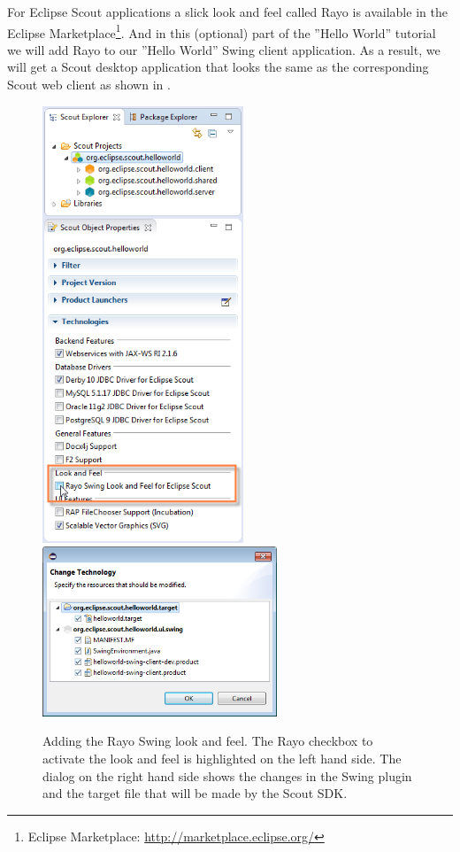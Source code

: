 \documentclass[a4paper,10pt,twoside]{book}
\begin{document}
For Eclipse Scout applications a slick look and feel called Rayo is available in the Eclipse Marketplace\footnote{
Eclipse Marketplace: \url{http://marketplace.eclipse.org/}
}.
And in this (optional) part of the ''Hello World'' tutorial we will add Rayo to our ''Hello World'' Swing client application.
As a result, we will get a Scout desktop application that looks the same as the corresponding Scout web client as shown in .

\begin{figure}
\includegraphics[width=6cm]{sdk_rayo_add_checkbox.png} \hspace{5mm}
\includegraphics[width=7cm]{sdk_rayo_confirm_changes.png}
\caption{Adding the Rayo Swing look and feel. The Rayo checkbox to activate the look and feel is highlighted on the left hand side. The dialog on the right hand side shows the changes in the Swing plugin and the target file that will be made by the Scout SDK.}
\end{figure}
\end{document}
